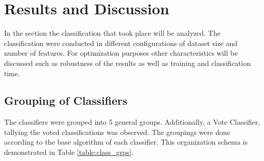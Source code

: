 \section{Results and Discussion}
	In the section the classification that took place will be analyzed. The classification were conducted in different configurations of  dataset size and number of features. For optimization purposes other characteristics will be discussed such as robustness of the results as well as training and classification time.
	
	\subsection{Grouping of Classifiers}
		The classifiers were grouped into 5 general groups. Additionally, a Vote Classifier, tallying the voted classifications was observed. The groupings were done according to the base algorithm of each classifier. This organization schema is demonstrated in Table \ref{table:class_grps}.
		
